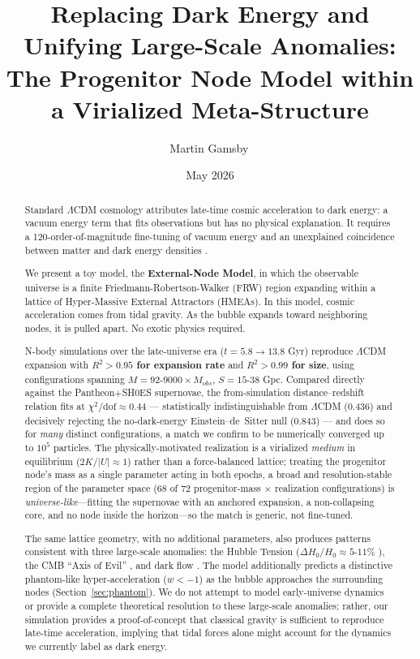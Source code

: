 \documentclass{article}
\title{Replacing Dark Energy and Unifying Large-Scale Anomalies: \\ The Progenitor Node Model within a Virialized Meta-Structure}
\author{Martin Gamsby\,\orcidlink{0009-0007-4069-9687}}
\date{May 2026}
\begin{document}
\maketitle

\begin{abstract}
Standard $\Lambda$CDM cosmology \cite{Planck2020} attributes late-time cosmic acceleration to dark energy: a vacuum energy term that fits observations but has no physical explanation.
It requires a 120-order-of-magnitude fine-tuning of vacuum energy \cite{Weinberg1989} and an unexplained coincidence between matter and dark energy densities \cite{Steinhardt1999}.

We present a toy model, the \textbf{External-Node Model}, in which the observable universe is a finite Friedmann-Robertson-Walker (FRW) region expanding within a lattice of Hyper-Massive External Attractors (HMEAs).
In this model, cosmic acceleration comes from tidal gravity. As the bubble expands toward neighboring nodes, it is pulled apart. No exotic physics required.

N-body simulations over the late-universe era ($t=5.8 \rightarrow 13.8$ Gyr) reproduce $\Lambda$CDM expansion with \textbf{$R^2 > 0.95$ for expansion rate} and \textbf{$R^2 > 0.99$ for size}, using configurations spanning $M = 92$-$9000 \times M_{obs}$, $S = 15$-$38$ Gpc. Compared directly against the Pantheon$+$SH0ES supernovae, the from-simulation distance--redshift relation fits at \textbf{$\chi^2/\mathrm{dof} \approx 0.44$} --- statistically indistinguishable from $\Lambda$CDM ($0.436$) and decisively rejecting the no-dark-energy Einstein--de~Sitter null ($0.843$) --- and does so for \emph{many} distinct configurations, a match we confirm to be numerically converged up to $10^5$ particles. The physically-motivated realization is a virialized \emph{medium} in equilibrium ($2K/|U|\approx1$) rather than a force-balanced lattice; treating the progenitor node's mass as a single parameter acting in both epochs, a broad and resolution-stable region of the parameter space (68 of 72 progenitor-mass$\,\times\,$realization configurations) is \emph{universe-like}---fitting the supernovae with an anchored expansion, a non-collapsing core, and no node inside the horizon---so the match is generic, not fine-tuned.

The same lattice geometry, with no additional parameters, also produces patterns consistent with three large-scale anomalies: the Hubble Tension ($\Delta H_0/H_0 \approx 5$-$11\%$ \cite{Riess2022}), the CMB ``Axis of Evil'' \cite{Land2005}, and dark flow \cite{Watkins2023}. The model additionally predicts a distinctive phantom-like hyper-acceleration ($w < -1$) as the bubble approaches the surrounding nodes (Section~\ref{sec:phantom}).
We do not attempt to model early-universe dynamics or provide a complete theoretical resolution to these large-scale anomalies; rather, our simulation provides a proof-of-concept that classical gravity is sufficient to reproduce late-time acceleration, implying that tidal forces alone might account for the dynamics we currently label as dark energy.
\end{abstract}
\end{document}
